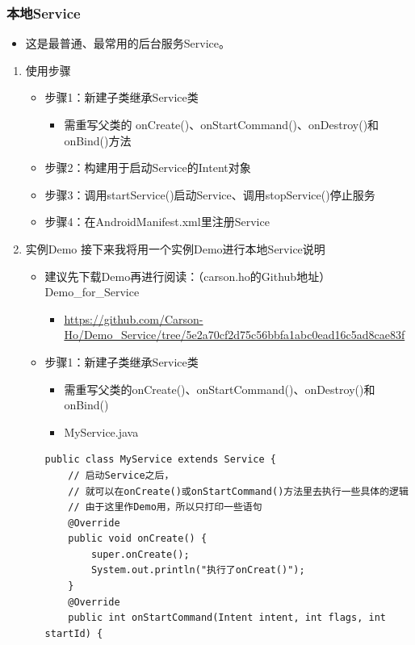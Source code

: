 \documentclass[9pt, b5paper]{article}
\begin{document}
\subsubsection{本地Service}
\label{sec-3-4-1}
\begin{itemize}
\item 这是最普通、最常用的后台服务Service。
\end{itemize}
\begin{enumerate}
\item 使用步骤
\label{sec-3-4-1-1}
\begin{itemize}
\item 步骤1：新建子类继承Service类
\begin{itemize}
\item 需重写父类的 onCreate()、onStartCommand()、onDestroy()和onBind()方法
\end{itemize}
\item 步骤2：构建用于启动Service的Intent对象
\item 步骤3：调用startService()启动Service、调用stopService()停止服务
\item 步骤4：在AndroidManifest.xml里注册Service
\end{itemize}
\item 实例Demo
\label{sec-3-4-1-2}
接下来我将用一个实例Demo进行本地Service说明
\begin{itemize}
\item 建议先下载Demo再进行阅读：（carson.ho的Github地址）Demo\_for\_Service
\begin{itemize}
\item \url{https://github.com/Carson-Ho/Demo_Service/tree/5e2a70cf2d75c56bbfa1abc0ead16c5ad8cae83f}
\end{itemize}
\item 步骤1：新建子类继承Service类
\begin{itemize}
\item 需重写父类的onCreate()、onStartCommand()、onDestroy()和onBind()
\item MyService.java
\end{itemize}
\begin{verbatim}
public class MyService extends Service {
    // 启动Service之后，
    // 就可以在onCreate()或onStartCommand()方法里去执行一些具体的逻辑
    // 由于这里作Demo用，所以只打印一些语句
    @Override
    public void onCreate() {
        super.onCreate();
        System.out.println("执行了onCreat()");
    }
    @Override
    public int onStartCommand(Intent intent, int flags, int startId) {

\end{verbatim}
\end{itemize}
\end{enumerate}
\end{document}
